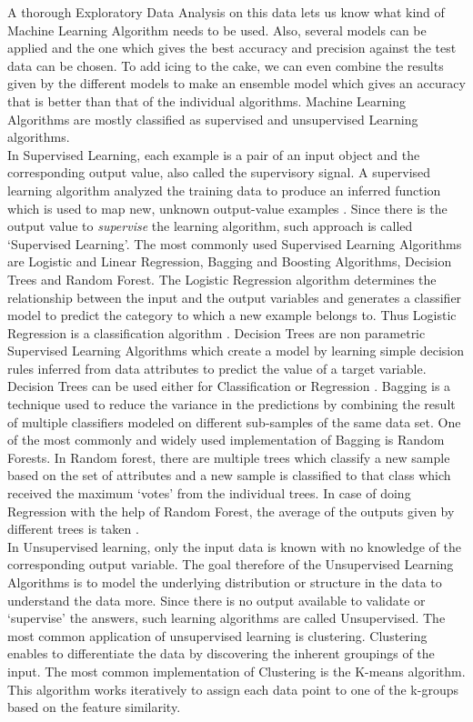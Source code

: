 A thorough Exploratory Data Analysis on this data lets us know what kind of Machine Learning Algorithm needs to be used. Also, several models can be applied and the one which gives the best accuracy and precision against the test data can be chosen. To add icing to the cake, we can even combine the results given by the different models to make an ensemble model which gives an accuracy that is better than that of the individual algorithms. Machine Learning Algorithms are mostly classified as supervised and unsupervised Learning algorithms.  \\
In Supervised Learning, each example is a pair of an input object and the corresponding output value, also called the supervisory signal. A supervised learning algorithm analyzed the training data to produce an inferred function which is used to map new, unknown output-value examples \cite{link6}. Since there is the output value to \emph{supervise} the learning algorithm, such approach is called `Supervised Learning'. The most commonly used Supervised Learning Algorithms are Logistic and Linear Regression, Bagging and Boosting Algorithms, Decision Trees and Random Forest. The Logistic Regression algorithm determines the relationship between the input and the output variables and generates a classifier model to predict the category to which a new example belongs to. Thus Logistic Regression is a classification algorithm \cite{link7}. Decision Trees are non parametric Supervised Learning Algorithms which create a model by learning simple decision rules inferred from data attributes to predict the value of a target variable. Decision Trees can be used either for Classification or Regression \cite{link8}. Bagging is a technique used to reduce the variance in the predictions by combining the result of multiple classifiers modeled on different sub-samples of the same data set. One of the most commonly and widely used implementation of Bagging is Random Forests. In Random forest, there are multiple trees which classify a new sample based on the set of attributes and a new sample is classified to that class which received the maximum `votes' from the individual trees. In case of doing Regression with the help of Random Forest, the average of the outputs given by different trees is taken  \cite{link9}.\\
In Unsupervised learning, only the input data is known with no knowledge of the corresponding output variable. The goal therefore of the Unsupervised Learning Algorithms is to model the underlying distribution or structure in the data to understand the data more. Since there is no output available to validate or `supervise' the answers, such learning algorithms are called Unsupervised. The most common application of unsupervised learning is clustering. Clustering enables to differentiate the data by discovering the inherent groupings of the input. The most common implementation of Clustering is the K-means algorithm. This algorithm works iteratively to assign each data point to one of the k-groups based on the feature similarity.

